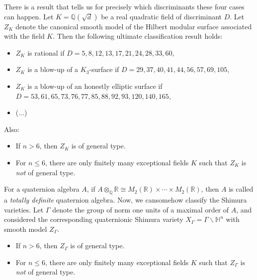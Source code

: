 \documentclass[reqno]{amsart} 
\numberwithin{theorem}{section}
\numberwithin{equation}{section}
\begin{document}
There is a result that tells us for precisely which discriminants these four cases can happen.  Let $K = \mathbb{Q}(\sqrt{d})$ be a real quadratic field of discriminant $D$.  Let $Z_K$ denote the canonical smooth model of the Hilbert modular surface associated with the field $K$.  Then the following ultimate classification result holds:
\begin{itemize}
\item $Z_K$ is rational if $D = 5,8,12,13,17,21,24,28,33,60$,
\item $Z_K$ is a blow-up of a $K_3$-surface if $D =29,37,40,41,44,56,57,69,105$,
\item $Z_K$ is a blow-up of an honestly elliptic surface if $D = 53,61,65,73,76,77,85,88,92,93,120,140,165$,
\item (...)
\end{itemize}
Also:
\begin{itemize}
\item If $n > 6$, then $Z_K$ is of general type.
\item For $n \leq 6$, there are only finitely many exceptional fields $K$ such that $Z_K$ is \emph{not} of general type.
\end{itemize}

For a quaternion algebra $A$, if $A \otimes_{\mathbb{Q}} \mathbb{R} \cong M_2(\mathbb{R}) \times \dotsb \times M_2(\mathbb{R})$, then $A$ is called a \emph{totally definite} quaternion algebra.  Now, we cansomehow classify the Shimura varieties.  Let $\Gamma$ denote the group of norm one units of a maximal order of $A$, and considered the corresponding quaternionic Shimura variety $X_\Gamma = \Gamma \backslash \mathbb{H}^n$ with smooth model $Z_\Gamma$.
\begin{itemize}
\item If $n > 6$, then $Z_\Gamma$ is of general type.
\item For $n \leq 6$, there are only finitely many exceptional fields $K$ such that $Z_\Gamma$ is \emph{not} of general type.
\end{itemize}
\end{document}
